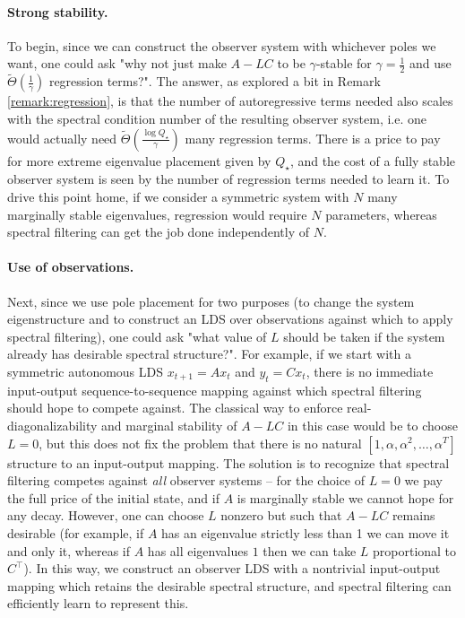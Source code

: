 \documentclass[11pt]{article}
\numberwithin{equation}{section}
\begin{document}
\paragraph{Strong stability.}
To begin, since we can construct the observer system with whichever poles we want, one could ask "why not just make $A-LC$ to be $\gamma$-stable for $\gamma = \frac{1}{2}$ and use $\widetilde{\Theta}\left(\frac{1}{\gamma}\right)$ regression terms?". The answer, as explored a bit in Remark \ref{remark:regression}, is that the number of autoregressive terms needed also scales with the spectral condition number of the resulting observer system, i.e. one would actually need $\widetilde{\Theta}\left(\frac{\log Q_\star}{\gamma}\right)$ many regression terms. There is a price to pay for more extreme eigenvalue placement given by $Q_\star$, and the cost of a fully stable observer system is seen by the number of regression terms needed to learn it. To drive this point home, if we consider a symmetric system with $N$ many marginally stable eigenvalues, regression would require $N$ parameters, whereas spectral filtering can get the job done independently of $N$.

\paragraph{Use of observations.}
Next, since we use pole placement for two purposes (to change the system eigenstructure and to construct an LDS over observations against which to apply spectral filtering), one could ask "what value of $L$ should be taken if the system already has desirable spectral structure?". For example, if we start with a symmetric autonomous LDS $x_{t+1} = Ax_t$ and $y_t = Cx_t$, there is no immediate input-output sequence-to-sequence mapping against which spectral filtering should hope to compete against. The classical way to enforce real-diagonalizability and marginal stability of $A-LC$ in this case would be to choose $L = 0$, but this does not fix the problem that there is no natural $[1, \alpha, \alpha^2, \ldots, \alpha^T]$ structure to an input-output mapping. The solution is to recognize that spectral filtering competes against \textit{all} observer systems -- for the choice of $L = 0$ we pay the full price of the initial state, and if $A$ is marginally stable we cannot hope for any decay. However, one can choose $L$ nonzero but such that $A- LC$ remains desirable (for example, if $A$ has an eigenvalue strictly less than 1 we can move it and only it, whereas if $A$ has all eigenvalues $1$ then we can take $L$ proportional to $C^\top$). In this way, we construct an observer LDS with a nontrivial input-output mapping which retains the desirable spectral structure, and spectral filtering can efficiently learn to represent this. 
\end{document}
